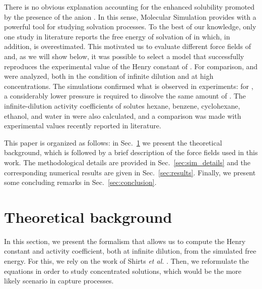 \documentclass[3p,twocolumn]{elsarticle}
\begin{document}
There is no obvious explanation accounting for the enhanced solubility promoted by the presence of the anion \ce{[B(CN)_4]^-}. In this sense, Molecular Simulation provides with a powerful tool for studying solvation processes. To the best of our knowledge, only one study in literature reports the free energy of solvation of  in \ce{[emim][B(CN)_4]} \cite{Liu_2014_1} which, in addition, is overestimated. This motivated us to evaluate different force fields of \ce{[emim][B(CN)_4]} and, as we will show below, it was possible to select a model that successfully reproduces the experimental value of the Henry constant of . For comparison, \ce{[emim][B(CN)_4]} and \ce{[emim][NTf_2]} were analyzed, both in the condition of infinite dilution and at high concentrations. The simulations confirmed what is observed in experiments: for \ce{[emim][B(CN)_4]}, a considerably lower pressure is required to dissolve the same amount of . The infinite-dilution activity coefficients of solutes hexane, benzene, cyclohexane, ethanol, and water in \ce{[emim][B(CN)_4]} were also calculated, and a comparison was made with experimental values recently reported in literature.

This paper is organized as follows: in Sec.~\ref{sec:theory} we present the theoretical background, which is followed by a brief description of the force fields used in this work. The methodological details are provided in Sec.~\ref{sec:sim_details} and the corresponding numerical results are given in Sec.~\ref{sec:results}. Finally, we present some concluding remarks in Sec.~\ref{sec:conclusion}.

\section{Theoretical background}
\label{sec:theory}

In this section, we present the formalism that allows us to compute the Henry constant and activity coefficient, both at infinite dilution, from the simulated free energy. For this, we rely on the work of Shirts \textit{et al.} \cite{Shirts_2003}. Then, we reformulate the equations in order to study concentrated solutions, which would be the more likely scenario in  capture processes.
\end{document}
